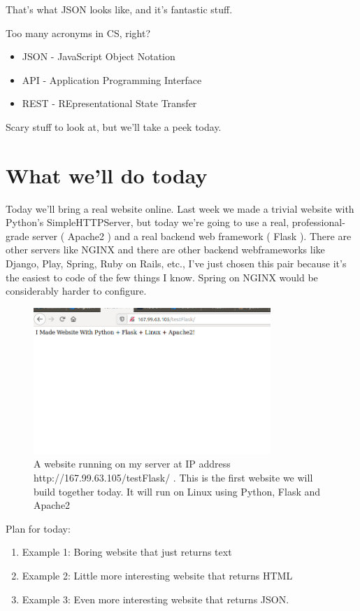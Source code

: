 \documentclass[10pt]{article}
\begin{document}
That's what JSON looks like, and it's fantastic stuff.

Too many acronyms in CS, right?

\begin{itemize}
\item JSON - JavaScript Object Notation
\item API - Application Programming Interface
\item REST - REpresentational State Transfer
\end{itemize}

Scary stuff to look at, but we'll take a peek today.

\section{What we'll do today}
Today we'll bring a real website online. Last week we made a trivial website with Python's SimpleHTTPServer, but today we're going to use a real, professional-grade server ( Apache2 ) and a real backend web framework ( Flask ). There are other servers like NGINX and there are other backend webframeworks like Django, Play, Spring, Ruby on Rails, etc., I've just chosen this pair because it's the easiest to code of the few things I know. Spring on NGINX would be considerably harder to configure.

\begin{figure}[h]
  \centering
    \includegraphics[width=0.8\textwidth]{Exercise1Success.png}
  \caption{A website running on my server at IP address
http://167.99.63.105/testFlask/ . This is the first website we will build
together today. It will run on Linux using Python, Flask and Apache2}
\end{figure}


Plan for today:
\begin{enumerate}
\item Example 1: Boring website that just returns text
\item Example 2: Little more interesting website that returns HTML
\item Example 3: Even more interesting website that returns JSON.
\end{enumerate}
\end{document}
